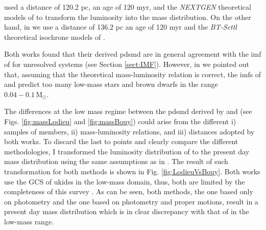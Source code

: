 \citet{Lodieu2012} used a distance of 120.2 pc, an age of 120 \gls{myr}, and the \emph{NEXTGEN} theoretical models of \citet{1998A&A...337..403B} to transform the luminosity into the mass distribution. On the other hand, in \citet{Bouy2015} we use a distance of 136.2 pc an age of 120 \gls{myr} and the \emph{BT-Settl} theoretical isochrone models of \citet{2014IAUS..299..271A}. 

Both works found that their derived \gls{pdsmd} are in general agreement with the \gls{imf} of \citet{Chabrier2005} for unresolved systems (see Section \ref{sect:IMF}). However, in \citet{Bouy2015} we pointed out that, assuming that the theoretical mass-luminosity relation is correct, the \glspl{imf} of \citet{Chabrier2005} and \citet{Thies2007} predict too many low-mass stars and brown dwarfs in the range $0.04-0.1\,\mathrm{M_{\odot}}$. 

The differences at the low mass regime between the \gls{pdsmd} derived by \citet{Lodieu2012} and \citet{Bouy2015} (see Figs. \ref{fig:massLodieu} and \ref{fig:massBouy}) could arise from the different i) samples of members, ii) mass-luminosity relations, and iii) distances adopted by both works. To discard the last to points and clearly compare the different methodologies, I transformed the luminosity distribution of \citet{Lodieu2012} to the present day mass distribution using the same assumptions as in \citet{Bouy2015}. The result of such transformation for both \citet{Lodieu2012} methods is shown in Fig. \ref{fig:LodieuVsBouy}. Both works use the GCS of \gls{ukidss} in the low-mass domain, thus, both are limited by the completeness of this survey  \cite[marked in grey, together with the high-mass domain of][]{Bouy2015}. As can be seen, both \citet{Lodieu2012} methods, the one based only on photometry and the one based on photometry and proper motions, result in a present day mass distribution which is in clear discrepancy with that of \citet{Bouy2015} in the low-mass range.

